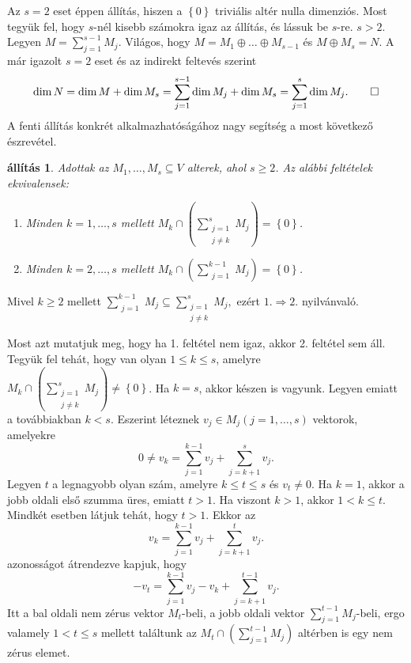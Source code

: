 \documentclass[9pt, showtrims]{memoir}
\makeatletter
\renewenvironment{proof}[1][\proofname]
    {\par\pushQED{\qed}%
    \normalfont \topsep6\p@\@plus6\p@\relax
    \trivlist
    \item[\hskip\labelsep
        \itshape
    #1\@addpunct{:}]\ignorespaces}
    {\popQED\endtrivlist\@endpefalse}
\theoremstyle{plain}
\newtheorem{proposition}{állítás}[section]
\theoremstyle{remark}
\theoremstyle{definition}
\makeatother
\begin{document}
\begin{proof}
    Az $s=2$ eset éppen  állítás,
    hiszen a $\left\{ 0 \right\}$ triviális altér nulla dimenziós.
    Most tegyük fel, hogy $s$-nél kisebb számokra igaz az állítás, 
    és lássuk be $s$-re. $s>2.$
    Legyen $M=\sum_{j=1}^{s-1}M_j.$
    Világos, hogy $M=M_1\oplus\dots\oplus M_{s-1}$ és $M\oplus M_s=N$.
    A már igazolt $s=2$ eset és az indirekt feltevés szerint
    \[
        \dim N
        =
        \dim M+\dim M_s
        =
        \sum_{j=1}^{s-1}\dim M_j+\dim M_s
        =
        \sum_{j=1}^{s}\dim M_j.\qedhere
    \]
\end{proof}
A fenti állítás konkrét alkalmazhatóságához nagy segítség a most következő észrevétel.
\begin{proposition}
    Adottak az $M_1,\dots,M_s\subseteq V$ alterek, ahol $s\geq 2$.
    Az alábbi feltételek ekvivalensek:
    \begin{enumerate}
        \item Minden $k=1,\dots,s$ mellett
            $M_k\cap\left( \sum_{\substack{j=1\\j\neq k}}^sM_j \right)=\left\{ 0 \right\}$.
        \item Minden $k=2,\dots,s$ mellett
            $M_k\cap\left( \sum_{\substack{j=1}}^{k-1}M_j \right)=\left\{ 0 \right\}$.
    \end{enumerate}
\end{proposition}
\begin{proof}
    Mivel $k\geq 2$ mellett
    $
    \sum_{\substack{j=1}}^{k-1}M_j
    \subseteq
    \sum_{\substack{j=1\\j\neq k}}^sM_j,
    $
    ezért $1.\Rightarrow 2.$ nyilvánvaló.

    Most azt mutatjuk meg, hogy ha 1. feltétel nem igaz, akkor 2. feltétel sem áll.
    Tegyük fel tehát, 
    hogy van olyan $1\leq k\leq s$,
    amelyre 
    $M_k\cap\left( \sum_{\substack{j=1\\j\neq k}}^sM_j \right)\neq\left\{ 0 \right\}$.
    Ha $k=s$, akkor készen is vagyunk.
    Legyen emiatt a továbbiakban $k<s$.
    Eszerint léteznek $v_j\in M_j (j=1,\dots,s)$ vektorok, amelyekre
    \[
        0\neq v_k=
        \sum_{j=1}^{k-1}v_j
        +
        \sum_{j=k+1}^{s}v_j.
    \]
    Legyen $t$ a legnagyobb olyan szám, amelyre $k\leq t\leq s$ és $v_t\neq 0$.
    Ha $k=1$, akkor a jobb oldali első szumma üres, emiatt $t>1$.
    Ha viszont $k>1$, akkor $1<k\leq t$.
    Mindkét esetben látjuk tehát, hogy $t>1$.
    Ekkor az
    \[
        v_k=
        \sum_{j=1}^{k-1}v_j
        +
        \sum_{j=k+1}^{t}v_j.
    \]
    azonosságot átrendezve kapjuk, hogy 
    \[
        -v_t
        =
        \sum_{j=1}^{k-1}v_j
        -
        v_k
        +
        \sum_{j=k+1}^{t-1}v_j.
    \]
    Itt a bal oldali nem zérus vektor $M_t$-beli, 
    a jobb oldali vektor $\sum_{j=1}^{t-1}M_j$-beli, 
    ergo valamely $1<t\leq s$ mellett találtunk az $M_t\cap\left( \sum_{j=1}^{t-1}M_j \right)$
    altérben is egy nem zérus elemet.
\end{proof}
\end{document}
